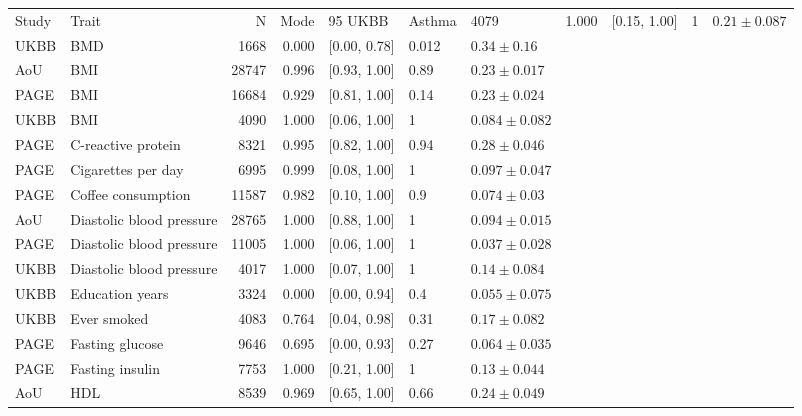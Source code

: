 \begin{tabular}{llrrlll}
\toprule
Study &                    Trait &     N &  Mode &  95%
\midrule
 UKBB &                   Asthma &  4079 & 1.000 &              [0.15, 1.00] &       1 &   $0.21 \pm 0.087$ \\
 UKBB &                      BMD &  1668 & 0.000 &              [0.00, 0.78] &   0.012 &    $0.34 \pm 0.16$ \\
  AoU &                      BMI & 28747 & 0.996 &              [0.93, 1.00] &    0.89 &   $0.23 \pm 0.017$ \\
 PAGE &                      BMI & 16684 & 0.929 &              [0.81, 1.00] &    0.14 &   $0.23 \pm 0.024$ \\
 UKBB &                      BMI &  4090 & 1.000 &              [0.06, 1.00] &       1 &  $0.084 \pm 0.082$ \\
 PAGE &       C-reactive protein &  8321 & 0.995 &              [0.82, 1.00] &    0.94 &   $0.28 \pm 0.046$ \\
 PAGE &       Cigarettes per day &  6995 & 0.999 &              [0.08, 1.00] &       1 &  $0.097 \pm 0.047$ \\
 PAGE &       Coffee consumption & 11587 & 0.982 &              [0.10, 1.00] &     0.9 &   $0.074 \pm 0.03$ \\
  AoU & Diastolic blood pressure & 28765 & 1.000 &              [0.88, 1.00] &       1 &  $0.094 \pm 0.015$ \\
 PAGE & Diastolic blood pressure & 11005 & 1.000 &              [0.06, 1.00] &       1 &  $0.037 \pm 0.028$ \\
 UKBB & Diastolic blood pressure &  4017 & 1.000 &              [0.07, 1.00] &       1 &   $0.14 \pm 0.084$ \\
 UKBB &          Education years &  3324 & 0.000 &              [0.00, 0.94] &     0.4 &  $0.055 \pm 0.075$ \\
 UKBB &              Ever smoked &  4083 & 0.764 &              [0.04, 0.98] &    0.31 &   $0.17 \pm 0.082$ \\
 PAGE &          Fasting glucose &  9646 & 0.695 &              [0.00, 0.93] &    0.27 &  $0.064 \pm 0.035$ \\
 PAGE &          Fasting insulin &  7753 & 1.000 &              [0.21, 1.00] &       1 &   $0.13 \pm 0.044$ \\
  AoU &                      HDL &  8539 & 0.969 &              [0.65, 1.00] &    0.66 &   $0.24 \pm 0.049$ \\

\end{tabular}
